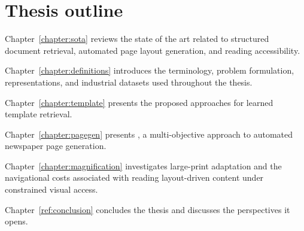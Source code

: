 \section{Thesis outline}

Chapter~\ref{chapter:sota} reviews the state of the art related to structured document
retrieval, automated page layout generation, and reading accessibility.

Chapter~\ref{chapter:definitions} introduces the terminology, problem formulation, representations,
and industrial datasets used throughout the thesis.

Chapter~\ref{chapter:template} presents the proposed approaches for learned template retrieval.

Chapter~\ref{chapter:pagegen} presents \methodNameGeneral, a multi-objective approach to automated
newspaper page generation.

Chapter~\ref{chapter:magnification} investigates large-print adaptation and the navigational costs
associated with reading layout-driven content under constrained visual
access.

Chapter~\ref{ref:conclusion} concludes the thesis and discusses the perspectives it
opens.